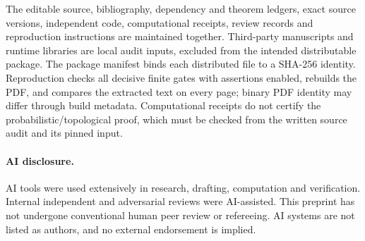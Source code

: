 \documentclass[11pt]{article}
\begin{document}
The editable source, bibliography, dependency and theorem ledgers, exact source versions, independent code, computational receipts, review records and reproduction instructions are maintained together. Third-party manuscripts and runtime libraries are local audit inputs, excluded from the intended distributable package. The package manifest binds each distributed file to a SHA-256 identity. Reproduction checks all decisive finite gates with assertions enabled, rebuilds the PDF, and compares the extracted text on every page; binary PDF identity may differ through build metadata. Computational receipts do not certify the probabilistic/topological proof, which must be checked from the written source audit and its pinned input.

\paragraph{AI disclosure.} AI tools were used extensively in research, drafting, computation and verification. Internal independent and adversarial reviews were AI-assisted. This preprint has not undergone conventional human peer review or refereeing. AI systems are not listed as authors, and no external endorsement is implied.
\end{document}
